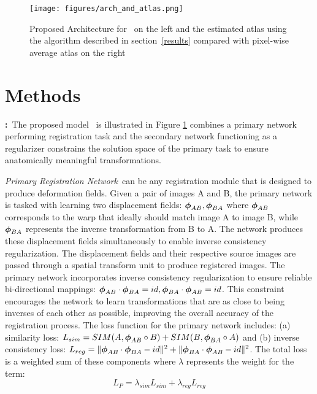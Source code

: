 \begin{figure}[!t]
    \centering
    \texttt{[image: figures/arch\_and\_atlas.png]}
    \vspace{-6mm}
    \caption{\small Proposed Architecture for \model~on the left and the estimated atlas using the algorithm described in section~\ref{results} compared with pixel-wise average atlas on the right}
    \label{architecture}
    \vspace{-8mm}
\end{figure}
\vspace{-7mm}
\section{Methods}


\noindent \textbf{\model:}~The proposed model \model~is illustrated in Figure \ref{architecture} combines a primary network performing registration task and the secondary network functioning as a regularizer constrains the solution space of the primary task to ensure anatomically meaningful transformations. 

\vspace{0.05in}
\noindent \textit{Primary Registration Network}~can be any registration module that is designed to produce deformation fields. Given a pair of images A and B, the primary network is tasked with learning two displacement fields: \({\boldsymbol{\phi}}_{AB}, {\boldsymbol{\phi}}_{BA}\) where \({\boldsymbol{\phi}}_{AB}\) corresponds to the warp that ideally should match image A to image B, while \({\boldsymbol{\phi}}_{BA}\) represents the inverse transformation from B to A. The network produces these displacement fields simultaneously to enable inverse consistency regularization. The displacement fields and their respective source images are passed through a spatial transform unit to produce registered images. The primary network incorporates inverse consistency regularization to ensure reliable bi-directional mappings: \({\boldsymbol{\phi}}_{AB} \cdot {\boldsymbol{\phi}}_{BA} = id, {\boldsymbol{\phi}}_{BA} \cdot {\boldsymbol{\phi}}_{AB} = id \). This constraint encourages the network to learn transformations that are as close to being inverses of each other as possible, improving the overall accuracy of the registration process. 
The loss function for the primary network includes: (a) similarity loss: \(L_{sim}=SIM(A,{\boldsymbol{\phi}}_{AB}\circ B)+SIM(B,{\boldsymbol{\phi}}_{BA}\circ A)\) and (b) inverse consistency loss: \(L_{reg}=\|{\boldsymbol{\phi}}_{AB}\cdot {\boldsymbol{\phi}}_{BA}-id\|^2+\|{\boldsymbol{\phi}}_{BA}\cdot {\boldsymbol{\phi}}_{AB}-id\|^2\). The total loss is a weighted sum of these components where \(\lambda\) represents the weight for the term:
\begin{equation} \label{reg_loss}
L_{P}=\lambda_{sim} L_{sim}+\lambda_{reg} L_{reg}
\end{equation}

